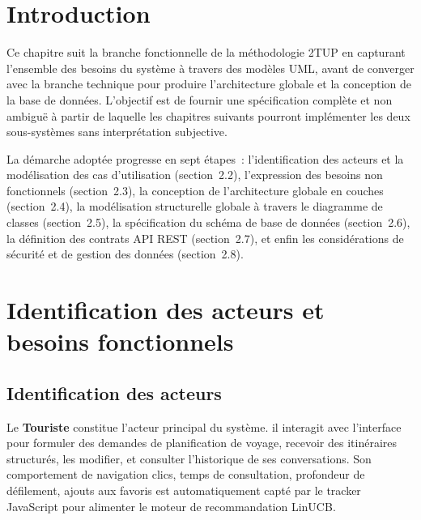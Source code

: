 
\section{Introduction}

Ce chapitre suit la branche fonctionnelle de la méthodologie 2TUP en capturant l'ensemble des
besoins du système à travers des modèles UML, avant de converger avec la branche technique pour
produire l'architecture globale et la conception de la base de données. L'objectif est de fournir
une spécification complète et non ambiguë à partir de laquelle les chapitres suivants pourront
implémenter les deux sous-systèmes sans interprétation subjective.

La démarche adoptée progresse en sept étapes~: l'identification des acteurs et la modélisation des
cas d'utilisation (section~2.2), l'expression des besoins non fonctionnels (section~2.3),
la conception de l'architecture globale en couches (section~2.4), la modélisation structurelle
globale à travers le diagramme de classes (section~2.5), la spécification du schéma de base de
données (section~2.6), la définition des contrats API REST (section~2.7), et enfin les
considérations de sécurité et de gestion des données (section~2.8).


\section{Identification des acteurs et besoins fonctionnels}

\subsection{Identification des acteurs}

Le \textbf{Touriste} constitue l'acteur principal du système. il interagit avec
l'interface pour formuler des demandes de planification de voyage, recevoir des itinéraires
structurés, les modifier, et consulter l'historique de ses conversations.
Son comportement de navigation   clics, temps de consultation, profondeur de défilement, ajouts
aux favoris   est automatiquement capté par le tracker JavaScript pour alimenter le moteur de
recommandation LinUCB.

